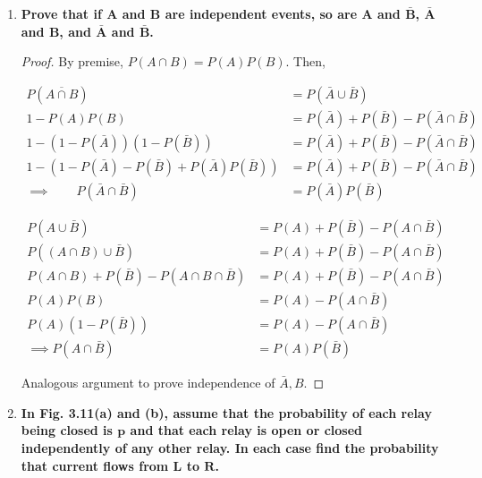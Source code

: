 \documentclass[10pt, oneside]{article}
\begin{document}
\begin{enumerate}[label=3.\arabic*]
\item  \begin{tcolorbox}[
  colback=Cerulean!5!white,
  colframe=Cerulean!75!black]
\textbf{Prove that if $\bm{A}$ and $\bm{B}$ are independent events, so are $\bm{A}$ and $\bm{\bar{B}}$, $\bm{\bar{A}}$ and $\bm{B}$, and $\bm{\bar{A}}$ and $\bm{\bar{B}}$.}
\end{tcolorbox}

\begin{proof}
By premise, $P(A \cap B) = P(A)P(B)$. Then,

\begin{align*}
P(\overline{A \cap B}) &= P(\bar{A} \cup \bar{B}) \\
1 - P(A) P(B)  &= P(\bar{A}) + P(\bar{B}) - P(\bar{A} \cap \bar{B}) \\
1 - (1 - P(\bar{A}))(1 - P(\bar{B})) &= P(\bar{A}) + P(\bar{B}) - P(\bar{A} \cap \bar{B}) \\
1 - (1 - P(\bar{A}) - P(\bar{B}) + P(\bar{A})P(\bar{B})) &= P(\bar{A}) + P(\bar{B}) - P(\bar{A} \cap \bar{B}) \\
\implies \qquad P(\bar{A} \cap \bar{B}) &= P(\bar{A})P(\bar{B})
\end{align*}

\begin{align*}
P(A \cup \bar{B}) &= P(A) + P(\bar{B}) - P(A \cap \bar{B}) \\
P((A \cap B) \cup \bar{B}) &= P(A) + P(\bar{B}) - P(A \cap \bar{B}) \\
P(A \cap B) + P(\bar{B}) - P(A \cap B \cap \bar{B}) &= P(A) + P(\bar{B}) - P(A \cap \bar{B}) \\
P(A)P(B) &= P(A) - P(A \cap \bar{B}) \\
P(A) (1 - P(\bar{B})) &= P(A) - P(A \cap \bar{B}) \\
\implies P(A \cap \bar{B}) &= P(A) P(\bar{B})
\end{align*}

Analogous argument to prove independence of $\bar{A}, B$.
\end{proof}

\item  \begin{tcolorbox}[
  colback=Cerulean!5!white,
  colframe=Cerulean!75!black]
\textbf{In Fig. 3.11(a) and (b), assume that the probability of each relay being closed is $\bm{p}$ and that each relay is open or closed independently of any other relay. In each case find the probability that current flows from $\bm{L}$ to $\bm{R}$.}
\end{tcolorbox}


\end{enumerate}
\end{document}
